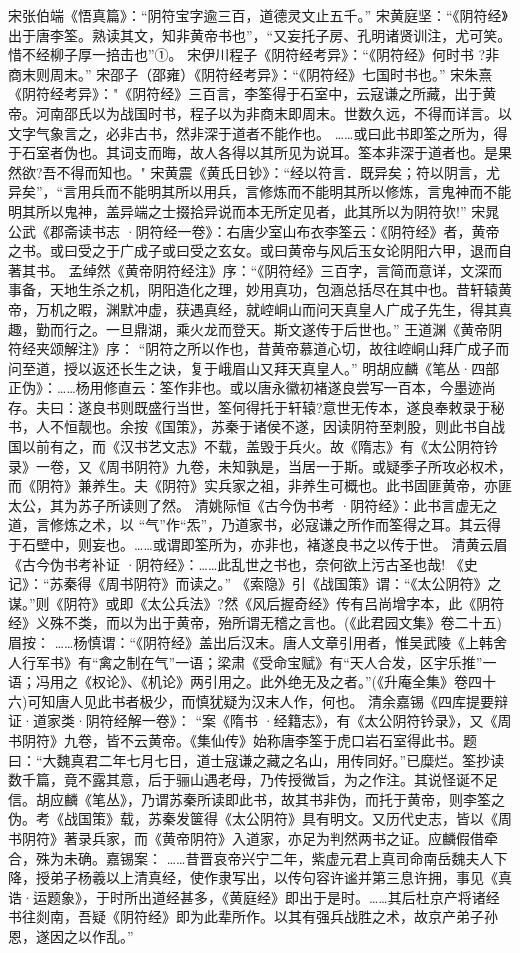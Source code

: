 \documentclass[12pt,UTF8]{ctexbook}
\begin{document}
宋张伯端《悟真篇》：“阴符宝字逾三百，道德灵文止五千。”
宋黄庭坚：“《阴符经》出于唐李筌。熟读其文，知非黄帝书也”，“又妄托子房、孔明诸贤训注，尤可笑。惜不经柳子厚一掊击也”①。
宋伊川程子《阴符经考异》：“《阴符经》何时书 ?非商末则周末。”
宋邵子（邵雍）《阴符经考异》：“《阴符经》七国时书也。”
宋朱熹《阴符经考异》："《阴符经》三百言，李筌得于石室中，云寇谦之所藏，出于黄帝。河南邵氏以为战国时书，程子以为非商末即周末。世数久远，不得而详言。以文字气象言之，必非古书，然非深于道者不能作也。 ……或曰此书即筌之所为，得于石室者伪也。其词支而晦，故人各得以其所见为说耳。筌本非深于道者也。是果然欲?吾不得而知也。"
宋黄震《黄氏日钞》：“经以符言．既异矣；符以阴言，尤异矣”，“言用兵而不能明其所以用兵，言修炼而不能明其所以修炼，言鬼神而不能明其所以鬼神，盖异端之士掇拾异说而本无所定见者，此其所以为阴符欤!”
宋晁公武《郡斋读书志 ·阴符经一卷》：右唐少室山布衣李筌云：《阴符经》者，黄帝之书。或曰受之于广成子或曰受之玄女。或曰黄帝与风后玉女论阴阳六甲，退而自著其书。
孟绰然《黄帝阴符经注》序：“《阴符经》三百字，言简而意详，文深而事备，天地生杀之机，阴阳造化之理，妙用真功，包涵总括尽在其中也。昔轩辕黄帝，万机之暇，渊默冲虚，获遇真经，就崆峒山而问天真皇人广成子先生，得其真趣，勤而行之。一旦鼎湖，乘火龙而登天。斯文遂传于后世也。”
王道渊《黄帝阴符经夹颂解注》序： “阴符之所以作也，昔黄帝慕道心切，故往崆峒山拜广成子而问至道，授以返还长生之诀，复于峨眉山又拜天真皇人。”
明胡应麟《笔丛·四部正伪》：……杨用修直云：筌作非也。或以唐永徽初褚遂良尝写一百本，今墨迹尚存。夫曰：遂良书则既盛行当世，筌何得托于轩辕?意世无传本，遂良奉敕录于秘书，人不恒靓也。余按《国策》，苏秦于诸侯不遂，因读阴符至刺股，则此书自战国以前有之，而《汉书艺文志》不载，盖毁于兵火。故《隋志》有《太公阴符钤录》一卷，又《周书阴符》九卷，未知孰是，当居一于斯。或疑季子所攻必权术，而《阴符》兼养生。夫《阴符》实兵家之祖，非养生可概也。此书固匪黄帝，亦匪太公，其为苏子所读则了然。
清姚际恒《古今伪书考 ·阴符经》：此书言虚无之道，言修炼之术，以 “气”作“炁”，乃道家书，必寇谦之所作而筌得之耳。其云得于石壁中，则妄也。……或谓即筌所为，亦非也，褚遂良书之以传于世。
清黄云眉《古今伪书考补证 ·阴符经》：……此乱世之书也，奈何欲上污古圣也哉! 《史记》：“苏秦得《周书阴符》而读之。” 《索隐》引《战国策》谓：“《太公阴符》之谋。”则《阴符》或即《太公兵法》?然《风后握奇经》传有吕尚增字本，此《阴符经》义殊不类，而以为出于黄帝，殆所谓无稽之言也。(《此君园文集》卷二十五)眉按： ……杨慎谓：“《阴符经》盖出后汉末。唐人文章引用者，惟吴武陵《上韩舍人行军书》有“禽之制在气”一语；梁肃《受命宝赋》有“天人合发，区宇乐推”一语；冯用之《权论》、《机论》两引用之。此外绝无及之者。”(《升庵全集》卷四十六)可知唐人见此书者极少，而慎犹疑为汉末人作，何也。
清余嘉锡《四库提要辩证·道家类·阴符经解一卷》： “案《隋书 ·经籍志》，有《太公阴符钤录》，又《周书阴符》九卷，皆不云黄帝。《集仙传》始称唐李筌于虎口岩石室得此书。题曰：“大魏真君二年七月七日，道士寇谦之藏之名山，用传同好。”已糜烂。筌抄读数千篇，竟不露其意，后于骊山遇老母，乃传授微旨，为之作注。其说怪诞不足信。胡应麟《笔丛》，乃谓苏秦所读即此书，故其书非伪，而托于黄帝，则李筌之伪。考《战国策》载，苏秦发箧得《太公阴符》具有明文。又历代史志，皆以《周书阴符》著录兵家，而《黄帝阴符》入道家，亦足为判然两书之证。应麟假借牵合，殊为未确。嘉锡案： ……昔晋哀帝兴宁二年，紫虚元君上真司命南岳魏夫人下降，授弟子杨羲以上清真经，使作隶写出，以传句容许谧并第三息许拥，事见《真诰·运题象》，于时所出道经甚多，《黄庭经》即出于是时。……其后杜京产将诸经书往剡南，吾疑《阴符经》即为此辈所作。以其有强兵战胜之术，故京产弟子孙恩，遂因之以作乱。”
\end{document}
